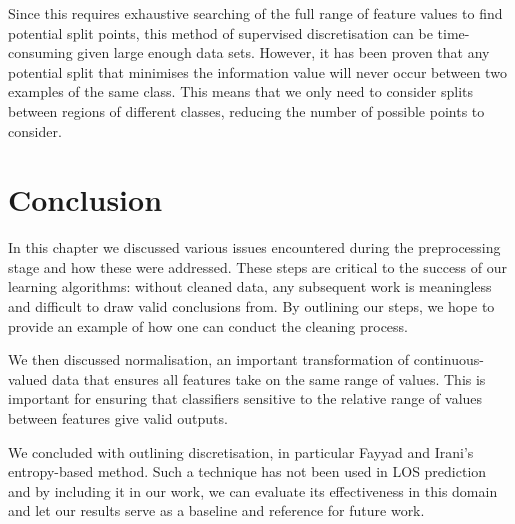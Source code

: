 Since this requires exhaustive searching of the full range of feature values
to find potential split points, this method of supervised discretisation can
be time-consuming given large enough data sets. However, it has been proven
that any potential split that minimises the information value will never occur
between two examples of the same class. This means that we only need to
consider splits between regions of different classes, reducing the number of
possible points to consider.

\section{Conclusion}
In this chapter we discussed various issues encountered during the
preprocessing stage and how these were addressed. These steps are critical to
the success of our learning algorithms: without cleaned data, any subsequent
work is meaningless and difficult to draw valid conclusions from. By outlining
our steps, we hope to provide an example of how one can conduct the cleaning
process.

We then discussed normalisation, an important transformation of
continuous-valued data that ensures all features take on the same range of
values. This is important for ensuring that classifiers sensitive to the
relative range of values between features give valid outputs.

We concluded with outlining discretisation, in particular Fayyad and Irani's
entropy-based method. Such a technique has not been used in LOS prediction
and by including it in our work, we can evaluate its effectiveness in this
domain and let our results serve
as a baseline and reference for future work.
